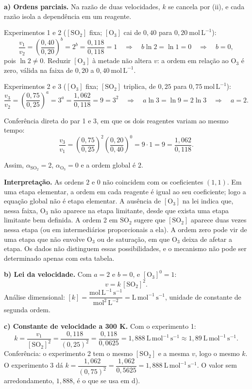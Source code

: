\documentclass{article}%
\begin{document}
\textbf{a) Ordens parciais.} Na razão de duas velocidades, $k$ se cancela por (ii), e cada razão isola a dependência em um reagente.

Experimentos 1 e 2 ($[\mathrm{SO_2}]$ fixa; $[\mathrm{O_3}]$ cai de $0{,}40$ para $0{,}20\ \mathrm{mol\,L^{-1}}$):
\[
\frac{v_1}{v_2} = \left(\frac{0{,}40}{0{,}20}\right)^{b} = 2^{b} = \frac{0{,}118}{0{,}118} = 1
\quad\Rightarrow\quad b\ln 2 = \ln 1 = 0 \quad\Rightarrow\quad b = 0,
\]
pois $\ln 2 \neq 0$. Reduzir $[\mathrm{O_3}]$ à metade não altera $v$: a ordem em relação ao $\mathrm{O_3}$ é zero, válida na faixa de $0{,}20$ a $0{,}40\ \mathrm{mol\,L^{-1}}$.

Experimentos 2 e 3 ($[\mathrm{O_3}]$ fixa; $[\mathrm{SO_2}]$ triplica, de $0{,}25$ para $0{,}75\ \mathrm{mol\,L^{-1}}$):
\[
\frac{v_3}{v_2} = \left(\frac{0{,}75}{0{,}25}\right)^{a} = 3^{a} = \frac{1{,}062}{0{,}118} = 9 = 3^{2}
\quad\Rightarrow\quad a\ln 3 = \ln 9 = 2\ln 3 \quad\Rightarrow\quad a = 2.
\]

Conferência direta do par 1 e 3, em que os dois reagentes variam ao mesmo tempo:
\[
\frac{v_3}{v_1} = \left(\frac{0{,}75}{0{,}25}\right)^{2}\left(\frac{0{,}20}{0{,}40}\right)^{0} = 9 \cdot 1 = 9 = \frac{1{,}062}{0{,}118}.
\]

Assim, $\alpha_{\mathrm{SO_2}} = 2$, $\alpha_{\mathrm{O_3}} = 0$ e a ordem global é $2$.

\textbf{Interpretação.} As ordens $2$ e $0$ não coincidem com os coeficientes $(1,1)$. Em uma etapa elementar, a ordem em cada reagente é igual ao seu coeficiente; logo a equação global não é etapa elementar. A ausência de $[\mathrm{O_3}]$ na lei indica que, nessa faixa, $\mathrm{O_3}$ não aparece na etapa limitante, desde que exista uma etapa limitante bem definida. A ordem 2 em $\mathrm{SO_2}$ sugere que $[\mathrm{SO_2}]$ aparece duas vezes nessa etapa (ou em intermediários proporcionais a ela). A ordem zero pode vir de uma etapa que não envolve $\mathrm{O_3}$ ou de saturação, em que $\mathrm{O_3}$ deixa de afetar a etapa. Os dados não distinguem essas possibilidades, e o mecanismo não pode ser determinado apenas com esta tabela.

\textbf{b) Lei da velocidade.} Com $a = 2$ e $b = 0$, e $[\mathrm{O_3}]^{0} = 1$:
\[
v = k\,[\mathrm{SO_2}]^{2}.
\]
Análise dimensional: $[k] = \dfrac{\mathrm{mol\,L^{-1}\,s^{-1}}}{\mathrm{mol^{2}\,L^{-2}}} = \mathrm{L\,mol^{-1}\,s^{-1}}$, unidade de constante de segunda ordem.

\textbf{c) Constante de velocidade a 300 K.} Com o experimento 1:
\[
k = \frac{v_1}{[\mathrm{SO_2}]^{2}} = \frac{0{,}118}{(0{,}25)^{2}} = \frac{0{,}118}{0{,}0625} = 1{,}888\ \mathrm{L\,mol^{-1}\,s^{-1}} \approx 1{,}89\ \mathrm{L\,mol^{-1}\,s^{-1}}.
\]
Conferência: o experimento 2 tem o mesmo $[\mathrm{SO_2}]$ e a mesma $v$, logo o mesmo $k$. O experimento 3 dá $k = \dfrac{1{,}062}{(0{,}75)^{2}} = \dfrac{1{,}062}{0{,}5625} = 1{,}888\ \mathrm{L\,mol^{-1}\,s^{-1}}$. O valor sem arredondamento, $1{,}888$, é o que se usa em d).
\end{document}

